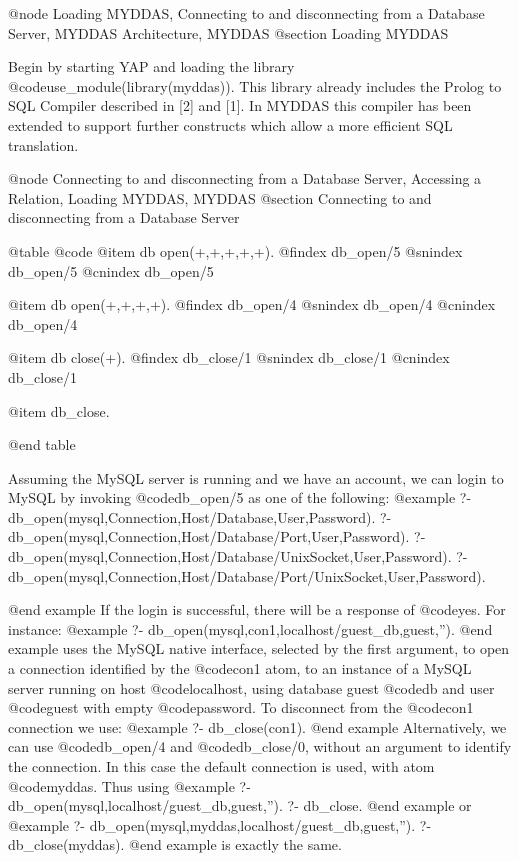 {{{{{{{{@node Loading MYDDAS, Connecting to and disconnecting from a Database Server, MYDDAS Architecture, MYDDAS 
@section Loading MYDDAS

Begin by starting YAP and loading the library
@code{use_module(library(myddas))}.  This library already includes the
Prolog to SQL Compiler described in [2] and [1]. In MYDDAS this compiler
has been extended to support further constructs which allow a more
efficient SQL translation.  

@node Connecting to and disconnecting from a Database Server, Accessing a Relation, Loading MYDDAS, MYDDAS
@section Connecting to and disconnecting from a Database Server


@table @code
@item db open(+,+,+,+,+). 
@findex db_open/5
@snindex db_open/5
@cnindex db_open/5

@item db open(+,+,+,+). 
@findex db_open/4
@snindex db_open/4
@cnindex db_open/4

@item db close(+). 
@findex db_close/1
@snindex db_close/1
@cnindex db_close/1

@item db_close.

@end table 

  Assuming the MySQL server is running and we have an account, we can
login to MySQL by invoking @code{db_open/5} as one of the following:
@example
?- db_open(mysql,Connection,Host/Database,User,Password). 
?- db_open(mysql,Connection,Host/Database/Port,User,Password).
?- db_open(mysql,Connection,Host/Database/UnixSocket,User,Password). 
?- db_open(mysql,Connection,Host/Database/Port/UnixSocket,User,Password).

@end example
If the login is successful, there will be a response of @code{yes}. For
instance:
 @example
?- db_open(mysql,con1,localhost/guest_db,guest,'').
@end example
uses the MySQL native interface, selected by the first argument, to open
a connection identified by the @code{con1} atom, to an instance of a
MySQL server running on host @code{localhost}, using database guest @code{db}
and user @code{guest} with empty @code{password}.  To disconnect from the @code{con1}
connection we use: 
@example
?- db_close(con1).
@end example
 Alternatively, we can use @code{db_open/4} and @code{db_close/0,} without an argument
to identify the connection. In this case the default connection is used,
with atom @code{myddas}. Thus using 
@example
?- db_open(mysql,localhost/guest_db,guest,''). 
?- db_close.  
@end example
or
@example
?- db_open(mysql,myddas,localhost/guest_db,guest,''). 
?- db_close(myddas). 
@end example
is exactly the same.

}}}}}}}}
